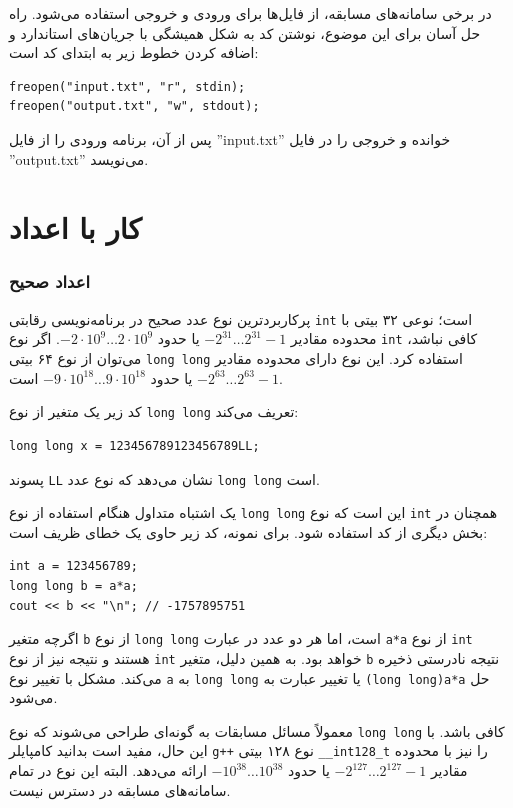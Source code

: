 در برخی سامانه‌های مسابقه، از فایل‌ها برای ورودی و خروجی استفاده می‌شود.
راه حل آسان برای این موضوع، نوشتن کد به شکل همیشگی با جریان‌های استاندارد و اضافه کردن خطوط زیر به ابتدای کد است:
\begin{lstlisting}
freopen("input.txt", "r", stdin);
freopen("output.txt", "w", stdout);
\end{lstlisting}
پس از آن، برنامه ورودی را از فایل ''input.txt'' خوانده و خروجی را در فایل ''output.txt'' می‌نویسد.

\section{کار با اعداد}


\subsubsection{اعداد صحیح}

پرکاربردترین نوع عدد صحیح در برنامه‌نویسی رقابتی \texttt{int} است؛ نوعی ۳۲ بیتی با محدوده مقادیر $-2^{31} \ldots 2^{31}-1$ یا حدود $-2 \cdot 10^9 \ldots 2 \cdot 10^9$.
اگر نوع \texttt{int} کافی نباشد، می‌توان از نوع ۶۴ بیتی \texttt{long long} استفاده کرد.
این نوع دارای محدوده مقادیر $-2^{63} \ldots 2^{63}-1$ یا حدود $-9 \cdot 10^{18} \ldots 9 \cdot 10^{18}$ است.

کد زیر یک متغیر از نوع \texttt{long long} تعریف می‌کند:
\begin{lstlisting}
long long x = 123456789123456789LL;
\end{lstlisting}
پسوند \texttt{LL} نشان می‌دهد که نوع عدد \texttt{long long} است.

یک اشتباه متداول هنگام استفاده از نوع \texttt{long long} این است که نوع \texttt{int} همچنان در بخش دیگری از کد استفاده شود.
برای نمونه، کد زیر حاوی یک خطای ظریف است:

\begin{lstlisting}
int a = 123456789;
long long b = a*a;
cout << b << "\n"; // -1757895751
\end{lstlisting}

اگرچه متغیر \texttt{b} از نوع \texttt{long long} است، اما هر دو عدد در عبارت \texttt{a*a} از نوع \texttt{int} هستند و نتیجه نیز از نوع \texttt{int} خواهد بود.
به همین دلیل، متغیر \texttt{b} نتیجه نادرستی ذخیره می‌کند.
مشکل با تغییر نوع \texttt{a} به \texttt{long long} یا تغییر عبارت به \texttt{(long long)a*a} حل می‌شود.

معمولاً مسائل مسابقات به گونه‌ای طراحی می‌شوند که نوع \texttt{long long} کافی باشد.
با این حال، مفید است بدانید کامپایلر \texttt{g++} نوع ۱۲۸ بیتی \texttt{\_\_int128\_t} را نیز با محدوده مقادیر $-2^{127} \ldots 2^{127}-1$ یا حدود $-10^{38} \ldots 10^{38}$ ارائه می‌دهد.
البته این نوع در تمام سامانه‌های مسابقه در دسترس نیست.

